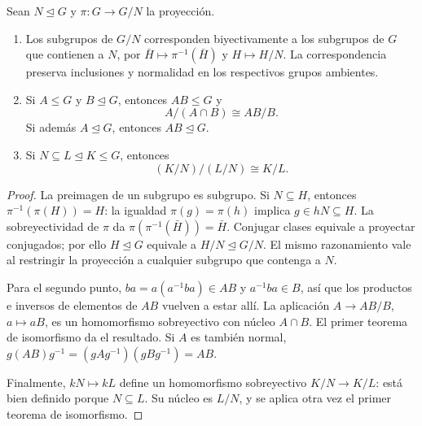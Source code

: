\begin{lema}\label{lema:C8-cocientes}
Sean $N\trianglelefteq G$ y $\pi:G\to G/N$ la proyección.
\begin{enumerate}
\item Los subgrupos de $G/N$ corresponden biyectivamente a los subgrupos de $G$ que contienen a $N$, por $\bar H\mapsto\pi^{-1}(\bar H)$ y $H\mapsto H/N$. La correspondencia preserva inclusiones y normalidad en los respectivos grupos ambientes.
\item Si $A\le G$ y $B\trianglelefteq G$, entonces $AB\le G$ y
\[
A/(A\cap B)\cong AB/B.
\]
Si además $A\trianglelefteq G$, entonces $AB\trianglelefteq G$.
\item Si $N\subseteq L\trianglelefteq K\le G$, entonces
\[
(K/N)/(L/N)\cong K/L.
\]
\end{enumerate}
\end{lema}
\begin{proof}
La preimagen de un subgrupo es subgrupo. Si $N\subseteq H$, entonces $\pi^{-1}(\pi(H))=H$: la igualdad $\pi(g)=\pi(h)$ implica $g\in hN\subseteq H$. La sobreyectividad de $\pi$ da $\pi(\pi^{-1}(\bar H))=\bar H$. Conjugar clases equivale a proyectar conjugados; por ello $H\trianglelefteq G$ equivale a $H/N\trianglelefteq G/N$. El mismo razonamiento vale al restringir la proyección a cualquier subgrupo que contenga a $N$.

Para el segundo punto, $ba=a(a^{-1}ba)\in AB$ y $a^{-1}ba\in B$, así que los productos e inversos de elementos de $AB$ vuelven a estar allí. La aplicación $A\to AB/B$, $a\mapsto aB$, es un homomorfismo sobreyectivo con núcleo $A\cap B$. El primer teorema de isomorfismo da el resultado. Si $A$ es también normal, $g(AB)g^{-1}=(gAg^{-1})(gBg^{-1})=AB$.

Finalmente, $kN\mapsto kL$ define un homomorfismo sobreyectivo $K/N\to K/L$: está bien definido porque $N\subseteq L$. Su núcleo es $L/N$, y se aplica otra vez el primer teorema de isomorfismo.
\end{proof}

